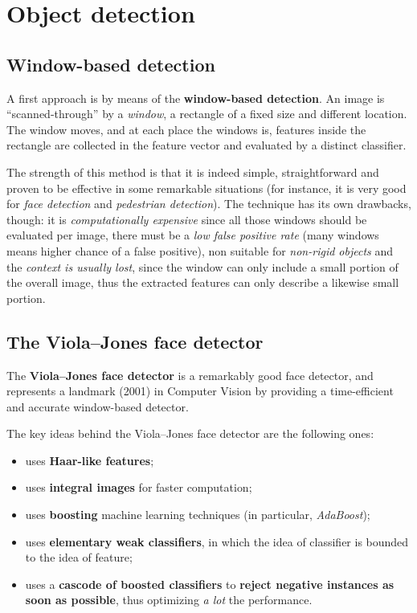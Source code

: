\documentclass[10pt]{report}
\begin{document}
\section{Object detection}
\label{sec:org0e25742}
\subsection{Window\--based detection}
\label{sec:org4340f6e}
A first approach is by means of the \textbf{window\--based detection}. An image is ``scanned\--through'' by a \emph{window}, a rectangle of a fixed size and different location. The window moves, and at each place the windows is, features inside the rectangle are collected in the feature vector and evaluated by a distinct classifier.

The strength of this method is that it is indeed simple, straightforward and proven to be effective in some remarkable situations (for instance, it is very good for \emph{face detection} and \emph{pedestrian detection}). The technique has its own drawbacks, though: it is \emph{computationally expensive} since all those windows should be evaluated per image, there must be a \emph{low false positive rate} (many windows means higher chance of a false positive), non suitable for \emph{non\--rigid objects} and the \emph{context is usually lost}, since the window can only include a small portion of the overall image, thus the extracted features can only describe a likewise small portion.
\subsection{The Viola\---Jones face detector}
\label{sec:org51a620d}
The \textbf{Viola\---Jones face detector} is a remarkably good face detector, and represents a landmark (2001) in Computer Vision by providing a time\--efficient and accurate window\--based detector.

The key ideas behind the Viola\---Jones face detector are the following ones:
\begin{itemize}
\item uses \textbf{Haar\--like features};
\item uses \textbf{integral images} for faster computation;
\item uses \textbf{boosting} machine learning techniques (in particular, \emph{AdaBoost});
\item uses \textbf{elementary weak classifiers}, in which the idea of classifier is bounded to the idea of feature;
\item uses a \textbf{cascode of boosted classifiers} to \textbf{reject negative instances as soon as possible}, thus optimizing \emph{a lot} the performance.
\end{itemize}
\end{document}
